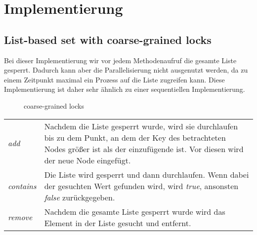 \section{Implementierung}
\label{sec:implementation}
\subsection{List-based set with coarse-grained locks}

Bei dieser Implementierung wir vor jedem Methodenaufruf die gesamte Liste gesperrt. Dadurch kann aber die Parallelisierung 
nicht ausgenutzt werden, da zu einem Zeitpunkt maximal ein Prozess auf die Liste zugreifen kann. Diese Implementierung ist 
daher sehr ähnlich zu einer sequentiellen Implementierung.

\begin{figure}[H]
	\centering
	\caption{coarse-grained locks}
	\label{tik:coarse-grained}
\end{figure}

\begin{table}[H]
    \begin{tabularx}{\textwidth}{lX}
        \textit{add} & Nachdem die Liste gesperrt wurde, wird sie durchlaufen bis zu dem Punkt, an dem der Key des betrachteten Nodes größer ist als der einzufügende ist. Vor diesen wird der neue Node eingefügt. \\
        \textit{contains} & Die Liste wird gesperrt und dann durchlaufen. Wenn dabei der gesuchten Wert gefunden wird, wird \textit{true}, ansonsten \textit{false} zurückgegeben.\\
        \textit{remove} & Nachdem die gesamte Liste gesperrt wurde wird das Element in der Liste gesucht und entfernt.\\
    \end{tabularx}
\end{table}

